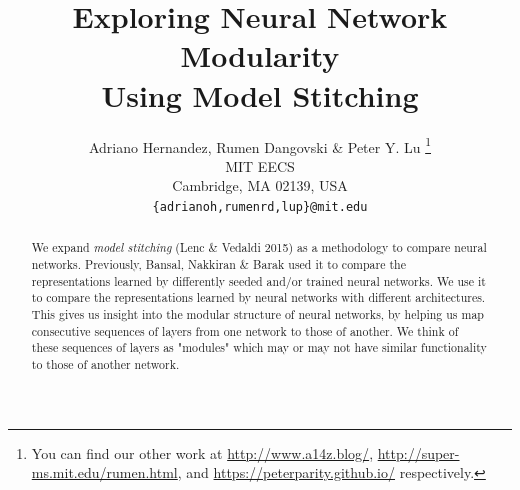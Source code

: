 \documentclass{article} %
\title{Exploring Neural Network Modularity \\ Using Model Stitching}
\author{Adriano Hernandez, Rumen Dangovski \& Peter Y. Lu \thanks{You can find our other work at \url{http://www.a14z.blog/}, \url{http://super-ms.mit.edu/rumen.html}, and \url{https://peterparity.github.io/} respectively.} \\
MIT EECS\\
Cambridge, MA 02139, USA \\
\texttt{\{adrianoh,rumenrd,lup\}@mit.edu}
}
\begin{document}
\maketitle

\begin{abstract}
We expand \textit{model stitching} (Lenc \& Vedaldi 2015) as a methodology to compare neural networks.
Previously, Bansal, Nakkiran \& Barak used it to compare the representations learned by differently seeded and/or trained neural networks.
We use it to compare the representations learned by neural networks with different architectures.
This gives us insight into the modular structure of neural networks, by helping us map consecutive sequences of layers from one network to those of another.
We think of these sequences of layers as "modules" which may or may not have similar functionality to those of another network.
\end{abstract}
\end{document}
